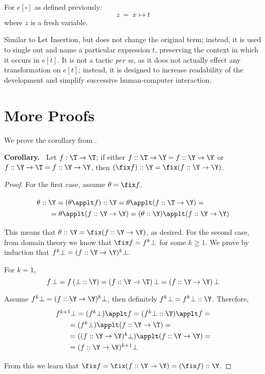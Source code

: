\vspace{3mm}
For $e[\square]$ as defined previously:
\[z ~=~ \overline{x}\mapsto t\]
%
where $z$ is a fresh variable.

Similar to Let Insertion, but does not change the original term; instead,
it is used to single out and name a particular expression $t$, preserving the context
in which it occurs in $e[t]$. It is not a tactic {\it per se}, as it does not
actually effect any transformation on $e[t]$; instead, it is designed to increase
readability of the development and simplify successive human-computer interaction.

\section{More Proofs}

We prove the corollary from .

\medskip\noindent
{\bf Corollary.~} Let $f : \T\to\T$; if either $f :: \T\to\Y = f :: \Y\to\Y$ or $f :: \Y\to\T = f :: \Y\to\Y$, 
then $(\fix f)::\Y = \fix (f :: \Y\to\Y)$.

\begin{proof}

 For the first case, assume $\theta=\fix f$,

\[\renewcommand\arraystretch{1.3}
  \begin{array}{l}
   \theta::\Y = (\theta\applt f)::\Y = \theta\applt(f::\T\to\Y) = \\
   \qquad=\theta\applt(f::\Y\to\Y) = (\theta::\Y)\applt(f::\Y\to\Y)
 \end{array}\]

This means that $\theta::\Y = \fix(f::\Y\to\Y)$, as desired.
For the second case, from domain theory we know that $\fix f = f^k\bot$ for some $k\geq 1$.
We prove by induction that $f^k\bot = (f :: \Y\to\Y)^k\bot$.

For $k=1$, \[f\,\bot = f\,(\bot :: \Y) = (f :: \Y\to\T)\,\bot = (f :: \Y\to\Y)\,\bot\]

Assume $f^k\bot = (f :: \Y\to\Y)^k\bot$, then definitely $f^k\bot = f^k\bot :: \Y$.
Therefore, 
\[\renewcommand\arraystretch{1.3}
  \begin{array}{l}
    f^{k+1}\bot = (f^k\bot)\applt f = (f^k\bot::\Y)\applt f = \\
    \qquad = (f^k\bot)\applt(f::\Y\to\T) = \\
    \qquad = ((f :: \Y\to\Y)^k\bot) \applt (f::\Y\to\Y) = \\
    \qquad = (f::\Y\to\Y)^{k+1}\bot
  \end{array}
\]

From this we learn that $\fix f = \fix(f :: \Y\to\Y) = (\fix f) :: \Y$.
\end{proof}
